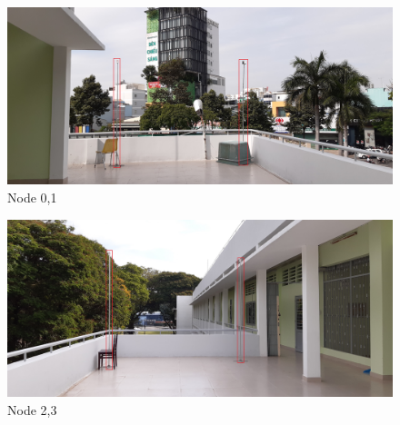 \documentclass[\main/main.tex]{subfiles}
\begin{document}
\begin{figure}[H]      
    \centering
    \includegraphics[width=1\textwidth]{arena_01.jpg}
    \caption{Node 0,1}
    \label{fig:node_0_1}
\end{figure}

\begin{figure}[H]      
    \centering
    \includegraphics[width=1\textwidth]{arena_02.jpg}
    \caption{Node 2,3}
    \label{fig:node_2_3}
\end{figure}

\end{document}
